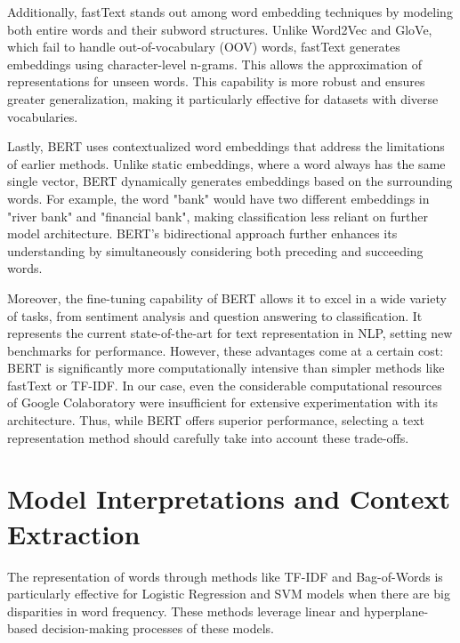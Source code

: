 Additionally, fastText stands out among word embedding techniques by modeling both entire words and their subword structures. Unlike Word2Vec and GloVe, which fail to handle out-of-vocabulary (OOV) words, fastText generates embeddings using character-level n-grams. This allows the approximation of representations for unseen words. This capability is more robust and ensures greater generalization, making it particularly effective for datasets with diverse vocabularies. 

\vspace{3mm}

Lastly, BERT uses contextualized word embeddings that address the limitations of earlier methods. Unlike static embeddings, where a word always has the same single vector, BERT dynamically generates embeddings based on the surrounding words. For example, the word "bank" would have two different embeddings in "river bank" and "financial bank", making classification less reliant on further model architecture. BERT’s bidirectional approach further enhances its understanding by simultaneously considering both preceding and succeeding words.

\vspace{3mm}

Moreover, the fine-tuning capability of BERT allows it to excel in a wide variety of tasks, from sentiment analysis and question answering to classification. It represents the current state-of-the-art for text representation in NLP, setting new benchmarks for performance. However, these advantages come at a certain cost: BERT is significantly more computationally intensive than simpler methods like fastText or TF-IDF. In our case, even the considerable computational resources of Google Colaboratory were insufficient for extensive experimentation with its architecture. Thus, while BERT offers superior performance, selecting a text representation method should carefully take into account these trade-offs.

\section{Model Interpretations and Context Extraction}

\vspace{3mm}

The representation of words through methods like TF-IDF and Bag-of-Words is particularly effective for Logistic Regression and SVM models when there are big disparities in word frequency. These methods leverage linear and hyperplane-based decision-making processes of these models. 

